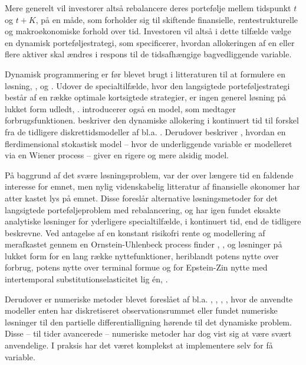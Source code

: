 \documentclass[
  a4paper,
  oneside]{memoir}
\begin{document}
Mere generelt vil investorer altså rebalancere deres portefølje mellem tidspunkt \(t\) og \(t+K\), på en måde, som forholder sig til skiftende finansielle, rentestrukturelle og makroøkonomiske forhold over tid. Investoren vil altså i dette tilfælde vælge en dynamisk porteføljestrategi, som specificerer, hvordan allokeringen af en eller flere aktiver skal ændres i respons til de tidsafhængige bagvedliggende variable.

Dynamisk programmering er før blevet brugt i litteraturen til at formulere en løsning, \citep{Mossin1968}, \citep{Samuelson1969} og \citep{Merton1969, Merton1971, Merton1973}. Udover de specialtilfælde, hvor den langsigtede porteføljestrategi består af en række optimale kortsigtede strategier, er ingen generel løsning på lukket form udledt, \citep{JurVic2011}. \citep{Samuelson1969} introducerer også en model, som medtager forbrugsfunktionen. \citep{Merton1969} beskriver den dynamiske allokering i kontinuert tid til forskel fra de tidligere diskrettidsmodeller af bl.a. \citep{Samuelson1969}. Derudover beskriver \citep{Merton1969}, hvordan en flerdimensional stokastisk model -- hvor de underliggende variable er modelleret via en Wiener process -- giver en rigere og mere alsidig model.

På baggrund af det svære løsningsproblem, var der over længere tid en faldende interesse for emnet, men nylig videnskabelig litteratur af finansielle økonomer har atter kastet lys på emnet. Disse foreslår alternative løsningsmetoder for det langsigtede porteføljeproblem med rebalancering, og har igen fundet eksakte analytiske løsninger for yderligere specialtilfælde, i kontinuert tid, end de tidligere beskrevne. Ved antagelse af en konstant risikofri rente og modellering af merafkastet gennem en Ornstein-Uhlenbeck process finder \citep{BrenXia2002}, \citep{CampVic1999}, \citep{KimOm1996} og \citep{Wachter2002} løsninger på lukket form for en lang række nyttefunktioner, heriblandt potens nytte over forbrug, potens nytte over terminal formue og for Epstein-Zin nytte med intertemporal substitutionselasticitet lig én, \citep{CampVic2003}.

Derudover er numeriske metoder blevet foreslået af bl.a. \citep{BalLyn1999}, \citep{Lyn2001}, \citep{Bar2000}, \citep{BrenSchLag1997, BrenSchLag1999}, hvor de anvendte modeller enten har diskretiseret observationsrummet eller fundet numeriske løsninger til den partielle differentialligning hørende til det dynamiske problem. Disse -- til tider avancerede -- numeriske metoder har dog vist sig at være svært anvendelige. I praksis har det været komplekst at implementere selv for få variable.
\end{document}
